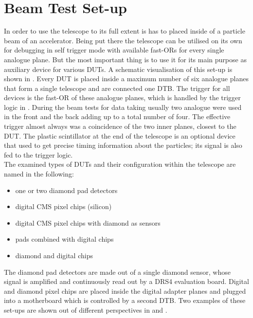 \documentclass[british,11pt,a4paper]{memoir}
\begin{document}
\section{Beam Test Set-up}
In order to use the telescope to its full extent is has to placed inside of a particle beam of an accelerator. Being put there the telescope can be utilised on its own for debugging in self trigger mode with available fast-ORs for every single analogue plane. But the most important thing is to use it for its main purpose as auxiliary device for various \ac{DUT}s. A schematic visualisation of this set-up is shown in . Every \ac{DUT} is placed inside a maximum number of six analogue planes that form a single telescope and are connected one \ac{DTB}. The trigger for all devices is the fast-OR of these analogue planes, which is handled by the trigger logic in . During the beam tests for data taking usually two analogue were used in the front and the back adding up to a total number of four. The effective trigger almost always was a coincidence of the two inner planes, closest to the \ac{DUT}. The plastic scintillator at the end of the telescope is an optional device that used to get precise timing information about the particles; its signal is also fed to the trigger logic.\\
The examined types of \ac{DUT}s and their configuration within the telescope are named in the following:
\begin{itemize}
	\item one or two diamond pad detectors
	\item digital CMS pixel chips (silicon)
	\item digital CMS pixel chips with diamond as sensors
	\item pads combined with digital chips
	\item diamond and digital chips
\end{itemize}
The diamond pad detectors are made out of a single diamond sensor, whose signal is amplified and continuously read out by a DRS4 evaluation board. Digital and diamond pixel chips are placed inside the digital adapter planes and plugged into a motherboard which is controlled by a second \ac{DTB}. Two examples of these set-ups are shown out of different perspectives in  and .
\end{document}
